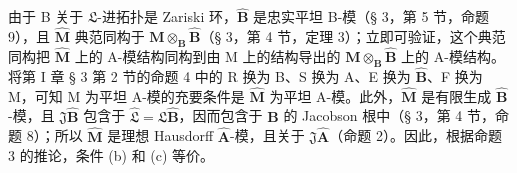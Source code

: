 由于 B 关于 \(\mathfrak{L}\)-进拓扑是 Zariski 环，\(\hat{\mathbf{B}}\) 是忠实平坦 B-模（§ 3，第 5 节，命题 9），且 \(\hat{\mathbf{M}}\) 典范同构于 \(\mathbf{M} \otimes_{\mathbf{B}} \hat{\mathbf{B}}\)（§ 3，第 4 节，定理 3）；立即可验证，这个典范同构把 \(\hat{\mathbf{M}}\) 上的 A-模结构同构到由 M 上的结构导出的 \(\mathbf{M} \otimes_{\mathbf{B}} \hat{\mathbf{B}}\) 上的 A-模结构。将第 I 章 § 3 第 2 节的命题 4 中的 R 换为 B、S 换为 A、E 换为 \(\hat{\mathbf{B}}\)、F 换为 M，可知 M 为平坦 A-模的充要条件是 \(\hat{\mathbf{M}}\) 为平坦 A-模。此外，\(\hat{\mathbf{M}}\) 是有限生成 \(\hat{\mathbf{B}}\)-模，且 \(\mathfrak{J}\hat{\mathbf{B}}\) 包含于 \(\hat{\mathfrak{L}} = \mathfrak{L}\hat{\mathbf{B}}\)，因而包含于 \(\hat{\mathbf{B}}\) 的 Jacobson 根中（§ 3，第 4 节，命题 8）；所以 \(\hat{\mathbf{M}}\) 是理想 Hausdorff \(\hat{\mathbf{A}}\)-模，且关于 \(\mathfrak{J}\hat{\mathbf{A}}\)（命题 2）。因此，根据命题 3 的推论，条件 (b) 和 (c) 等价。



